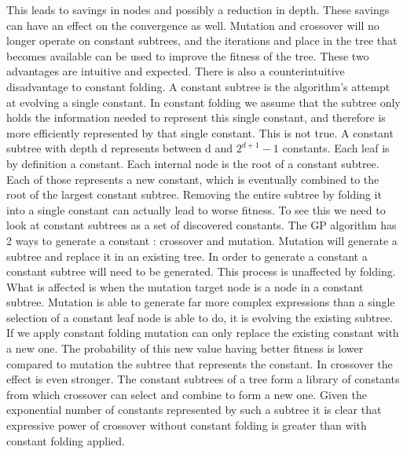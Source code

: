 This leads to savings in nodes and possibly a reduction in depth. These savings can have an effect on the convergence as well. Mutation and crossover will no longer operate on constant subtrees, and the iterations and place in the tree that becomes available can be used to improve the fitness of the tree. These two advantages are intuitive and expected. There is also a counterintuitive disadvantage to constant folding. A constant subtree is the algorithm's attempt at evolving a single constant. In constant folding we assume that the subtree only holds the information needed to represent this single constant, and therefore is more efficiently represented by that single constant. This is not true. A constant subtree with depth d represents between d and $2^{d+1}-1$ constants. Each leaf is by definition a constant. Each internal node is the root of a constant subtree. Each of those represents a new constant, which is eventually combined to the root of the largest constant subtree. Removing the entire subtree by folding it into a single constant can actually lead to worse fitness. To see this we need to look at constant subtrees as a set of discovered constants. The GP algorithm has 2 ways to generate a constant : crossover and mutation. Mutation will generate a subtree and replace it in an existing tree. In order to generate a constant a constant subtree will need to be generated. This process is unaffected by folding. What is affected is when the mutation target node is a node in a constant subtree. Mutation is able to generate far more complex expressions than a single selection of a constant leaf node is able to do, it is evolving the existing subtree. If we apply constant folding mutation can only replace the existing constant with a new one. The probability of this new value having better fitness is lower compared to mutation the subtree that represents the constant. 
In crossover the effect is even stronger. The constant subtrees of a tree form a library of constants from which crossover can select and combine to form a new one. Given the exponential number of constants represented by such a subtree it is clear that expressive power of crossover without constant folding is greater than with constant folding applied. 

